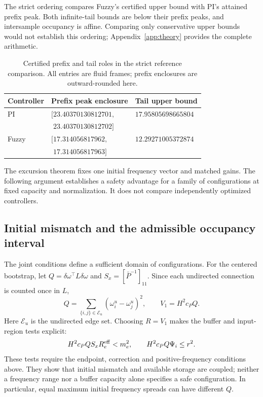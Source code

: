 The strict ordering compares Fuzzy's certified upper bound with PI's
attained prefix peak. Both infinite-tail bounds are below their
prefix peaks, and intersample occupancy is affine. Comparing only
conservative upper bounds would not establish this ordering;
Appendix~\ref{app:theory} provides the complete arithmetic.

\begin{table}[t]
\caption{Certified prefix and tail roles in the strict reference comparison.
All entries are fluid frames; prefix enclosures are outward-rounded here.}
\label{tab:btd_prefix_tail}
\centering
\begin{tabular}{@{}lll@{}}\toprule
Controller & Prefix peak enclosure & Tail upper bound\\\midrule
PI & $[23.40370130812701,$ & $17.95805698665804$\\
 & $\phantom{[}23.40370130812702]$ & \\
Fuzzy & $[17.314056817962,$ & $12.29271005372874$\\
 & $\phantom{[}17.314056817963]$ & \\\bottomrule
\end{tabular}
\end{table}

The excursion theorem fixes one initial frequency vector and matched
gains. The following argument establishes a safety advantage for a
family of configurations at fixed capacity and normalization.
It does not compare independently optimized controllers.

\subsection{Initial mismatch and the admissible occupancy interval}
\label{subsec:btd_occupancy_domain}
The joint conditions define a sufficient domain of configurations.
For the centered bootstrap, let
$Q=\delta\omega^\top L\delta\omega$ and
$S_x=[\bar P^{-1}]_{11}$. Since each undirected connection is
counted once in $L$,
\begin{equation}
 Q=\sum_{\{i,j\}\in\mathcal E_u}(\omega_i^u-\omega_j^u)^2,
 \qquad V_1=H^2c_PQ.
 \label{eq:btd_mismatch_energy}
\end{equation}
Here $\mathcal E_u$ is the undirected edge set. Choosing $R=V_1$
makes the buffer and input-region tests explicit:
\begin{equation}
 H^2c_PQ S_xR_e^{\rm eff}<m_e^2,\qquad
 H^2c_PQ\Psi_i\le r^2.
 \label{eq:btd_configuration_slice}
\end{equation}
These tests require the endpoint, correction and positive-frequency
conditions above. They show that initial mismatch and available
storage are coupled; neither a frequency range nor a buffer capacity
alone specifies a safe configuration. In particular, equal maximum
initial frequency spreads can have different $Q$.


